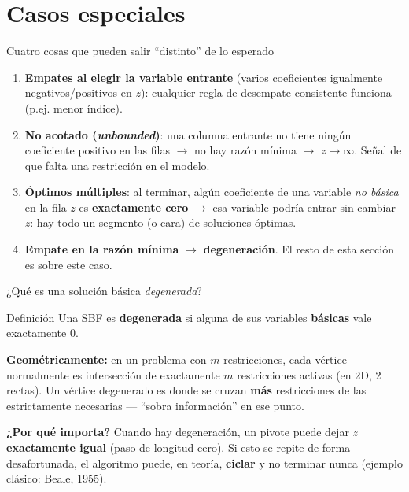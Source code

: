 \documentclass[aspectratio=169]{beamer}
\begin{document}
\section{Casos especiales}

\begin{frame}{Cuatro cosas que pueden salir ``distinto'' de lo esperado}
\begin{enumerate}
\item \textbf{Empates al elegir la variable entrante} (varios coeficientes igualmente negativos/positivos en $z$): cualquier regla de desempate consistente funciona (p.ej. menor índice).
\item \textbf{No acotado (\emph{unbounded})}: una columna entrante no tiene ningún coeficiente positivo en las filas $\to$ no hay razón mínima $\to$ $z\to\infty$. Señal de que falta una restricción en el modelo.
\item \textbf{Óptimos múltiples}: al terminar, algún coeficiente de una variable \emph{no básica} en la fila $z$ es \textbf{exactamente cero} $\to$ esa variable podría entrar sin cambiar $z$: hay todo un segmento (o cara) de soluciones óptimas.
\item \textbf{Empate en la razón mínima} $\to$ \textbf{degeneración}. El resto de esta sección es sobre este caso.
\end{enumerate}
\end{frame}

\begin{frame}{¿Qué es una solución básica \emph{degenerada}?}
\begin{block}{Definición}
Una SBF es \textbf{degenerada} si alguna de sus variables \textbf{básicas} vale exactamente $0$.
\end{block}

\textbf{Geométricamente:} en un problema con $m$ restricciones, cada vértice normalmente es intersección de exactamente $m$ restricciones activas (en 2D, 2 rectas). Un vértice degenerado es donde se cruzan \textbf{más} restricciones de las estrictamente necesarias --- ``sobra información'' en ese punto.

\vspace{0.2cm}
\textbf{¿Por qué importa?} Cuando hay degeneración, un pivote puede dejar $z$ \textbf{exactamente igual} (paso de longitud cero). Si esto se repite de forma desafortunada, el algoritmo puede, en teoría, \textbf{ciclar} y no terminar nunca (ejemplo clásico: Beale, 1955).
\end{frame}
\end{document}
